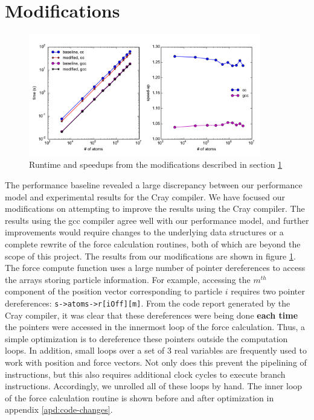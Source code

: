 \documentclass[12pt]{article}
\begin{document}
\section{Modifications}
\label{sec:mods}

\begin{figure}[h!]
  \centering
  \includegraphics[width=0.9\textwidth]{../figs/modified_forceLJ.pdf}
  \caption{Runtime and speedups from the modifications described in
   section \ref{sec:mods}}
   \label{fig:mod-force}
\end{figure}

The performance baseline revealed a large discrepancy between our
performance model and experimental results for the Cray compiler. We
have focused our modifications on attempting to improve the results
using the Cray compiler. The results using the gcc compiler agree well
with our performance model, and further improvements would require
changes to the underlying data structures or a complete rewrite of the
force calculation routines, both of which are beyond the scope of this
project. The results from our modifications are shown in figure
\ref{fig:mod-force}.
\\

The force compute function uses a large number of pointer dereferences
to access the arrays storing particle information. For example,
accessing the $m^{th}$ component of the position vector corresponding
to particle $i$ requires two pointer dereferences:
\texttt{s->atoms->r[iOff][m]}. From the code report generated by the
Cray compiler, it was clear that these dereferences were being done
{\bf each time} the pointers were accessed in the innermost loop of
the force calculation.  Thus, a simple optimization is to dereference
these pointers outside the computation loops.  In addition, small
loops over a set of 3 real variables are frequently used to work with
position and force vectors. Not only does this prevent the pipelining
of instructions, but this also requires additional clock cycles to
execute branch instructions.  Accordingly, we unrolled all of these
loops by hand. The inner loop of the force calculation routine is
shown before and after optimization in appendix
\ref{apd:code-changes}.
\\
\end{document}
